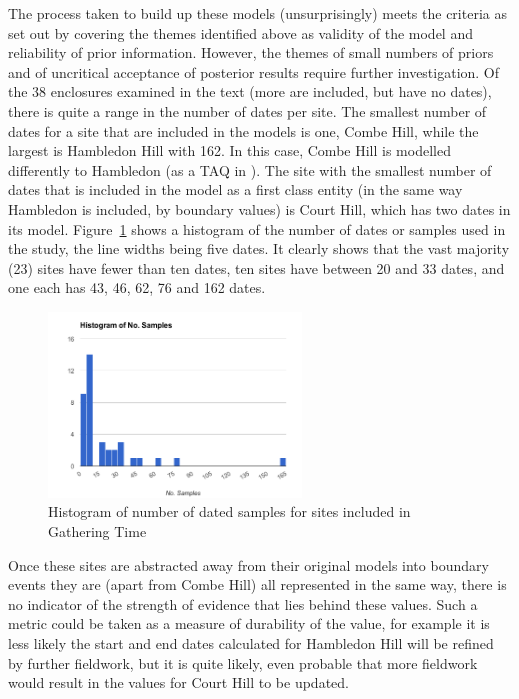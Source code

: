The process taken to build up these models (unsurprisingly) meets the criteria as set out by \citet{doi:10.1080/00438243.2015.1067640} covering the themes identified above as validity of the model and reliability of prior information. However, the themes of small numbers of priors and of uncritical acceptance of posterior results require further investigation. Of the 38 enclosures examined in the text (more are included, but have no dates), there is quite a range in the number of dates per site. The smallest number of dates for a site that are included in the models is one, Combe Hill, while the largest is Hambledon Hill with 162. In this case, Combe Hill is modelled differently to Hambledon (as a TAQ in \citealp[687]{Whittle:2011tg}). The site with the smallest number of dates that is included in the model as a first class entity (in the same way Hambledon is included, by boundary values) is Court Hill, which has two dates in its model. Figure~\ref{fig:date-counts} shows a histogram of the number of dates or samples used in the study, the line widths being five dates. It clearly shows that the vast majority (23) sites have fewer than ten dates, ten sites have between 20 and 33 dates, and one each has 43, 46, 62, 76 and 162 dates. 

\begin{figure}
\centering
	\includegraphics[width=0.6\textwidth]{figures/date-counts}
  \caption{Histogram of number of dated samples for sites included in Gathering Time}
  \label{fig:date-counts}
\end{figure}

Once these sites are abstracted away from their original models into boundary events they are (apart from Combe Hill) all represented in the same way, there is no indicator of the strength of evidence that lies behind these values. Such a metric could be taken as a measure of durability of the value, for example it is less likely the start and end dates calculated for Hambledon Hill will be refined by further fieldwork, but it is quite likely, even probable that more fieldwork would result in the values for Court Hill to be updated.

